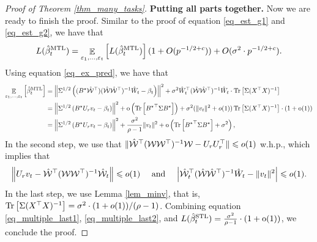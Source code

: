 \begin{proof}[Proof of Theorem \ref{thm_many_tasks}]
	\medskip
	\noindent\textbf{Putting all parts together.}
	Now we are ready to finish the proof.
	Similar to the proof of equation \eqref{eq_est_g1} and \eqref{eq_est_g2}, we have that
	\begin{align}
		L(\hat{\beta}_t^{\textup{MTL}}) = \mathop{\mathbb{E}}_{\varepsilon_1, \dots, \varepsilon_t}\left[ L(\hat{\beta}_t^{\textup{MTL}}) \right] (1 + O(p^{-1/2+c})) + O(\sigma^2 \cdot p^{-1/2 + c}). \label{eq_multiple_last1}
	\end{align}
	Using equation \eqref{eq_ex_pred}, we have that
	\begin{align}
		\mathop{\mathbb{E}}_{\varepsilon_1, \dots, \varepsilon_t}\left[ \hat{\beta}_t^{\textup{MTL}} \right] &= \left\| \Sigma^{1/2} \left((B^\star \hat{\mathcal W}^\top) (\hat{\mathcal W}\hat{\mathcal W}^{\top})^{-1} \hat W_t - \beta_t \right)  \right\|^2
		+ \sigma^2  \hat W_t^{\top} (\hat{\mathcal W}\hat{\mathcal W}^{\top})^{-1} \hat W_t \cdot \operatorname{Tr}\left[\Sigma (X^{\top}X)^{-1}\right] \nonumber \\
		&= \left\| \Sigma^{1/2} \left({B^{\star} U_r v_t-\beta_t}\right) \right\|^2 + \operatorname{o}\left(\operatorname{Tr}\left[{B^{\star}}^{\top} \Sigma B^{\star}\right]\right) + \sigma^2(\|v_t\|^2 + o(1)) \operatorname{Tr}\left[\Sigma (X^{\top}X)^{-1}\right] \cdot (1+\operatorname{o}(1)) \nonumber \\
		&= \left\| \Sigma^{1/2} \left({B^{\star} U_r v_t-\beta_t}\right) \right\|^2 + \frac{\sigma^2}{\rho-1}\|v_t\|^2 + \operatorname{o} \left( \operatorname{Tr}\left[{B^{\star}}^{\top} \Sigma B^{\star}\right] + \sigma^2\right), \label{eq_multiple_last2}
	\end{align}
	In the second step, we use that $\|\hat{{\mathcal W}}^{\top} ({\mathcal W} {\mathcal W}^{\top})^{-1} {\mathcal W} - U_r U_r^{\top}\| \leqslant o(1)$ w.h.p., which implies that
	\[ \left\| U_r v_t - \hat{{\mathcal W}}^{\top} ({\mathcal W} {\mathcal W}^{\top})^{-1} \hat{{\mathcal W}}_t \right\| \leqslant o(1) \quad \text{ and } \quad {\left| {\hat{{\mathcal W}}_t^{\top} (\hat{{\mathcal W}} \hat{{\mathcal W}}^{\top})^{-1} \hat{W}_t - \|v_t\|^2} \right|} \leqslant o(1). \]
  In the last step, we use Lemma \ref{lem_minv}, that is, $\operatorname{Tr}\left[\Sigma (X^{\top} X)^{-1}\right] = \sigma^2 \cdot (1 + o(1))/ (\rho - 1)$.
	Combining equation \eqref{eq_multiple_last1}, \eqref{eq_multiple_last2}, and $L(\hat{\beta}_t^{\textup{STL}})=\frac{\sigma^2}{\rho-1} \cdot \left( 1+\operatorname{o}(1)\right)$, we conclude the proof.
\end{proof}


